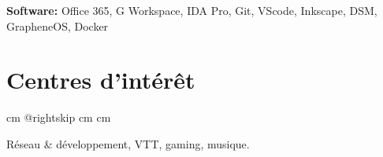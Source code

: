 \documentclass[a4paper, 11pt, fr-FR]{article}
\begin{document}
\textbf{Software:} Office 365, G Workspace, IDA Pro, Git, VScode, Inkscape, DSM, GrapheneOS, Docker \par\endgroup

\section{Centres d'intérêt}

\begingroup{} cm
\advance\csname @rightskip cm
\advance{} cm

Réseau \& développement, VTT, gaming, musique. \par\endgroup
\end{document}
